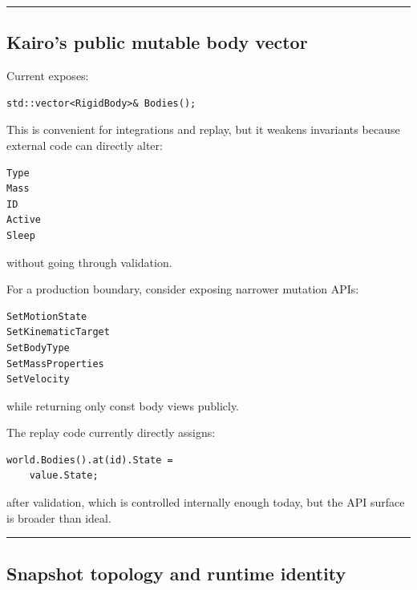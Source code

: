 \begin{center}\rule{0.5\linewidth}{0.5pt}\end{center}

\subsection{Kairo's public mutable body vector}\label{06-engine-ii-ch038-kairos-public-mutable-body-vector}

\hypertarget{06-engine-ii-ch038-kairos-public-mutable-body-vector}{}

Current  exposes:

\begin{verbatim}
std::vector<RigidBody>& Bodies();
\end{verbatim}

This is convenient for integrations and replay, but it weakens invariants because external code can directly alter:

\begin{verbatim}
Type
Mass
ID
Active
Sleep
\end{verbatim}

without going through validation.

For a production boundary, consider exposing narrower mutation APIs:

\begin{verbatim}
SetMotionState
SetKinematicTarget
SetBodyType
SetMassProperties
SetVelocity
\end{verbatim}

while returning only const body views publicly.

The replay code currently directly assigns:

\begin{verbatim}
world.Bodies().at(id).State =
    value.State;
\end{verbatim}

after validation, which is controlled internally enough today, but the API surface is broader than ideal.

\begin{center}\rule{0.5\linewidth}{0.5pt}\end{center}

\subsection{Snapshot topology and runtime identity}\label{06-engine-ii-ch038-snapshot-topology-and-runtime-identity}

